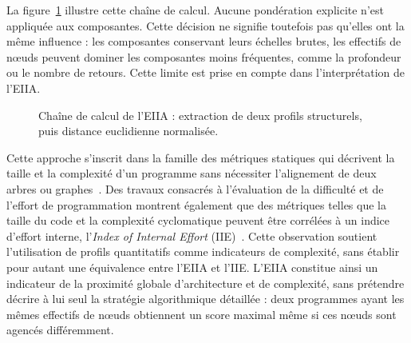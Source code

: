\documentclass[12pt,a4paper,oneside]{report}
\begin{document}
La figure~\ref{fig:eiia} illustre cette chaîne de calcul. Aucune pondération
explicite n'est appliquée aux composantes. Cette décision ne signifie toutefois
pas qu'elles ont la même influence : les composantes conservant leurs échelles
brutes, les effectifs de nœuds peuvent dominer les composantes moins fréquentes,
comme la profondeur ou le nombre de retours. Cette limite est prise en compte
dans l'interprétation de l'EIIA.

\begin{figure}[htbp]
\centering
{}%
\caption{Chaîne de calcul de l'EIIA : extraction de deux profils structurels,
puis distance euclidienne normalisée.}
\label{fig:eiia}
\end{figure}

Cette approche s'inscrit dans la famille des métriques statiques qui décrivent
la taille et la complexité d'un programme sans nécessiter l'alignement de deux
arbres ou graphes~\cite{vujosevic-janicic_software_2013}. Des travaux consacrés à l'évaluation de la
difficulté et de l'effort de programmation montrent également que des
métriques telles que la taille du code et la complexité cyclomatique peuvent
être corrélées à un indice d'effort interne, l'\emph{Index of Internal Effort}
(IIE)~\cite{de_oliveira_assessing_2024}. Cette observation soutient l'utilisation de profils
quantitatifs comme indicateurs de complexité, sans établir pour autant une
équivalence entre l'EIIA et l'IIE. L'EIIA constitue ainsi un indicateur de la
proximité globale d'architecture et de complexité, sans prétendre décrire à
lui seul la stratégie algorithmique détaillée : deux programmes ayant les
mêmes effectifs de nœuds obtiennent un score maximal même si ces nœuds sont
agencés différemment.
\end{document}
